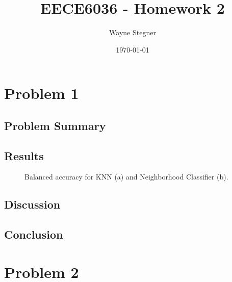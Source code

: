 \documentclass[a4paper, 11pt, titlepage]{article}
\title{EECE6036 - Homework 2}
\author{Wayne Stegner}
\date{\today}
\begin{document}
  \maketitle
  \section{Problem 1}
  \subsection{Problem Summary}
  \subsection{Results}
  \begin{figure}[ht]
    \center
    \caption{Balanced accuracy for KNN (a) and Neighborhood Classifier (b).}
    \label{fig:neighbor_bal_acc}
  \end{figure}
  \subsection{Discussion}
  \subsection{Conclusion}
  \pagebreak
  \section{Problem 2}
\end{document}
